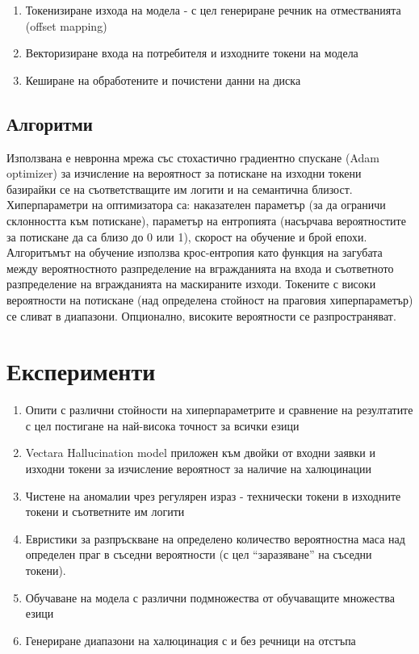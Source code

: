 \documentclass[12pt]{article}
\begin{document}
		\begin{enumerate}    
			\item[\textbullet] Токенизиране  изхода на модела - с цел генериране речник на отместванията (offset mapping)
			\item[\textbullet] Векторизиране входа на потребителя и изходните токени на модела
			\item[\textbullet] Кеширане на обработените и почистени данни на диска
			\end{enumerate}
	
	\subsection{Алгоритми} 
	
	Използвана е невронна мрежа със стохастично градиентно спускане (Adam optimizer) за изчисление на вероятност за потискане на изходни токени базирайки се на съответстващите им логити и на семантична близост. Хиперпараметри на оптимизатора са: наказателен параметър (за да ограничи склонността към потискане), параметър на ентропията (насърчава вероятностите за потискане да са близо до 0 или 1), скорост на обучение и брой епохи.
	Алгоритъмът на обучение използва крос-ентропия като функция на загубата между вероятностното разпределение на вгражданията на входа и съответното разпределение на вгражданията на  маскираните изходи. 
	Токените с високи вероятности на потискане (над определена стойност на праговия хиперпараметър) се сливат в диапазони. Опционално, високите вероятности се разпространяват.
	\section{Експерименти}
	
	\begin{enumerate}    
		\item[\textbullet] Опити с  различни стойности на хиперпараметрите и сравнение на резултатите с цел постигане на най-висока точност за всички езици
		\item[\textbullet] Vectara Hallucination model приложен към двойки от входни заявки и изходни токени за изчисление вероятност за наличие на халюцинации
		\item[\textbullet] Чистене на аномалии чрез регулярен израз - технически токени в изходните токени и съответните им логити
	    \item[\textbullet] Евристики за разпръскване на определено количество вероятностна маса над определен праг в съседни вероятности (с цел ``заразяване'' на съседни токени).
	     \item[\textbullet] Обучаване на модела с различни подмножества от обучаващите множества езици
	     \item[\textbullet] Генериране диапазони на халюцинация с и без речници на отстъпа
	\end{enumerate}
	
\end{document}
